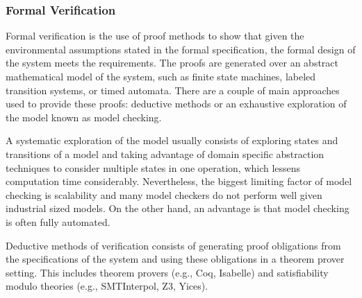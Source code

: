 \subsubsection{Formal Verification} 
Formal verification is the use of proof methods to show that given the environmental assumptions stated in the formal specification, the formal design of the system meets the requirements. The proofs are generated over an abstract mathematical model of the system, such as finite state machines, labeled transition systems, or timed automata. There are a couple of main approaches used to provide these proofs: deductive methods or an exhaustive exploration of the model known as model checking. 

A systematic exploration of the model usually consists of exploring states and transitions of a model and taking advantage of domain specific abstraction techniques to consider multiple states in one operation, which lessens computation time considerably. Nevertheless, the biggest limiting factor of model checking is scalability and many model checkers do not perform well given industrial sized models. On the other hand, an advantage is that model checking is often fully automated. 

Deductive methods of verification consists of generating proof obligations from the specifications of the system and using these obligations in a theorem prover setting. This includes theorem provers (e.g., Coq, Isabelle) and satisfiability modulo theories (e.g., SMTInterpol, Z3, Yices). 


 



